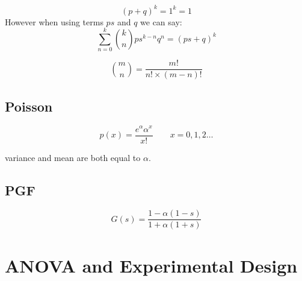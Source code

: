 \[
(p + q)^k = 1^{k} = 1
\]
However when using terms $ps$ and $q$ we can say:
\[
\sum_{n=0}^{k} {k \choose n}ps^{k-n}q^{n} = (ps + q)^k
\]


\[
{m \choose n}  = \frac{m!}{n! \times (m-n)!} \]

\section{Poisson}

\[ p(x) = \frac{e^{\alpha}\alpha^{x}}{x!} \qquad x = 0, 1,2 \dots
\]

variance and mean are both equal to $\alpha$.

\section{PGF}

\[
G(s) = \frac{1-\alpha(1-s)}{1+\alpha(1+s)}
\]












\chapter{ANOVA and Experimental Design }


